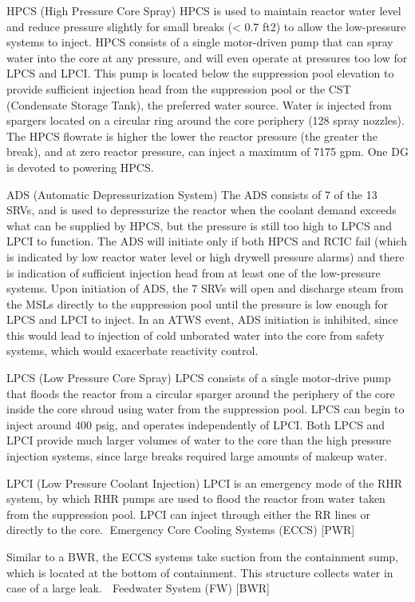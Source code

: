 \documentclass[10pt]{article}
\begin{document}
HPCS (High Pressure Core Spray)
HPCS is used to maintain reactor water level and reduce pressure slightly for small breaks (< 0.7 ft2) to allow the low-pressure systems to inject. HPCS consists of a single motor-driven pump that can spray water into the core at any pressure, and will even operate at pressures too low for LPCS and LPCI. This pump is located below the suppression pool elevation to provide sufficient injection head from the suppression pool  or the CST (Condensate Storage Tank), the preferred water source. Water is injected from spargers located on a circular ring around the core periphery (128 spray nozzles). The HPCS flowrate is higher the lower the reactor pressure (the greater the break), and at zero reactor pressure, can inject a maximum of 7175 gpm. One DG is devoted to powering HPCS. 

ADS (Automatic Depressurization System)
The ADS consists of 7 of the 13 SRVs, and is used to depressurize the reactor when the coolant demand exceeds what can be supplied by HPCS, but the pressure is still too high to LPCS and LPCI to function. The ADS will initiate only if both HPCS and RCIC fail (which is indicated by low reactor water level or high drywell pressure alarms) and there is indication of sufficient injection head from at least one of the low-pressure systems. Upon initiation of ADS, the 7 SRVs will open and discharge steam from the MSLs directly to the suppression pool until the pressure is low enough for LPCS and LPCI to inject.  In an ATWS event, ADS initiation is inhibited, since this would lead to injection of cold unborated water into the core from safety systems, which would exacerbate reactivity control. 

LPCS (Low Pressure Core Spray)
LPCS consists of a single motor-drive pump that floods the reactor from a circular sparger around the periphery of the core inside the core shroud using water from the suppression pool. LPCS can begin to inject around 400 psig, and operates independently of LPCI. Both LPCS and LPCI provide much larger volumes of water to the core than the high pressure injection systems, since large breaks required large amounts of makeup water. 

LPCI (Low Pressure Coolant Injection)
LPCI is an emergency mode of the RHR system, by which RHR pumps are used to flood the reactor from water taken from the suppression pool. LPCI can inject through either the RR lines or directly to the core.
Emergency Core Cooling Systems (ECCS) [PWR]

Similar to a BWR, the ECCS systems take suction from the containment sump, which is located at the bottom of containment. This structure collects water in case of a large leak. 
Feedwater System (FW) [BWR]
\end{document}
